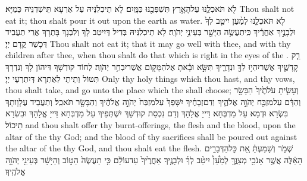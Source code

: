 {לֹ֖א תֹּאכְלֶ֑נּוּ עַל\maqqaf הָאָ֥רֶץ תִּשְׁפְּכֶ֖נּוּ כַּמָּֽיִם׃}
{לָא תֵיכְלִנֵּיהּ עַל אַרְעָא תֵּישְׁדִנֵּיהּ כְּמַיָּא׃}
{Thou shalt not eat it; thou shalt pour it out upon the earth as water.}{}
{לֹ֖א תֹּאכְלֶ֑נּוּ לְמַ֨עַן יִיטַ֤ב לְךָ֙ וּלְבָנֶ֣יךָ אַחֲרֶ֔יךָ כִּֽי\maqqaf תַעֲשֶׂ֥ה הַיָּשָׁ֖ר בְּעֵינֵ֥י יְהֹוָֽה׃}
{לָא תֵיכְלִנֵּיהּ בְּדִיל דְּיִיטַב לָךְ וְלִבְנָךְ בָּתְרָךְ אֲרֵי תַעֲבֵיד דְּכָשַׁר קֳדָם יְיָ׃}
{Thou shalt not eat it; that it may go well with thee, and with thy children after thee, when thou shalt do that which is right in the eyes of the \lord.}{}
{רַ֧ק קׇֽדָשֶׁ֛יךָ אֲשֶׁר\maqqaf יִהְי֥וּ לְךָ֖ וּנְדָרֶ֑יךָ תִּשָּׂ֣א וּבָ֔אתָ אֶל\maqqaf הַמָּק֖וֹם אֲשֶׁר\maqqaf יִבְחַ֥ר יְהֹוָֽה׃}
{לְחוֹד קוּדְשָׁךְ דִּיהוֹן לָךְ וְנִדְרָךְ תִּטּוֹל וְתֵיתֵי לְאַתְרָא דְּיִתְרְעֵי יְיָ׃}
{Only thy holy things which thou hast, and thy vows, thou shalt take, and go unto the place which the \lord\space shall choose;}{}
{וְעָשִׂ֤יתָ עֹלֹתֶ֙יךָ֙ הַבָּשָׂ֣ר וְהַדָּ֔ם עַל\maqqaf מִזְבַּ֖ח יְהֹוָ֣ה אֱלֹהֶ֑יךָ וְדַם\maqqaf זְבָחֶ֗יךָ יִשָּׁפֵךְ֙ עַל\maqqaf מִזְבַּח֙ יְהֹוָ֣ה אֱלֹהֶ֔יךָ וְהַבָּשָׂ֖ר תֹּאכֵֽל׃}
{וְתַעֲבֵיד עֲלָוָותָךְ בִּשְׂרָא וּדְמָא עַל מַדְבְּחָא דַּייָ אֱלָהָךְ וְדַם נִכְסַת קוּדְשָׁךְ יִשְׁתְּפֵיךְ עַל מַדְבְּחָא דַּייָ אֱלָהָךְ וּבִשְׂרָא תֵיכוֹל׃}
{and thou shalt offer thy burnt-offerings, the flesh and the blood, upon the altar of the \lord\space thy God; and the blood of thy sacrifices shall be poured out against the altar of the \lord\space thy God, and thou shalt eat the flesh.}{}
{שְׁמֹ֣ר וְשָׁמַעְתָּ֗ אֵ֚ת כׇּל\maqqaf הַדְּבָרִ֣ים הָאֵ֔לֶּה אֲשֶׁ֥ר אָנֹכִ֖י מְצַוֶּ֑ךָּ לְמַ֩עַן֩ יִיטַ֨ב לְךָ֜ וּלְבָנֶ֤יךָ אַחֲרֶ֙יךָ֙ עַד\maqqaf עוֹלָ֔ם כִּ֤י תַעֲשֶׂה֙ הַטּ֣וֹב וְהַיָּשָׁ֔ר בְּעֵינֵ֖י יְהֹוָ֥ה אֱלֹהֶֽיךָ׃ \setuma }
